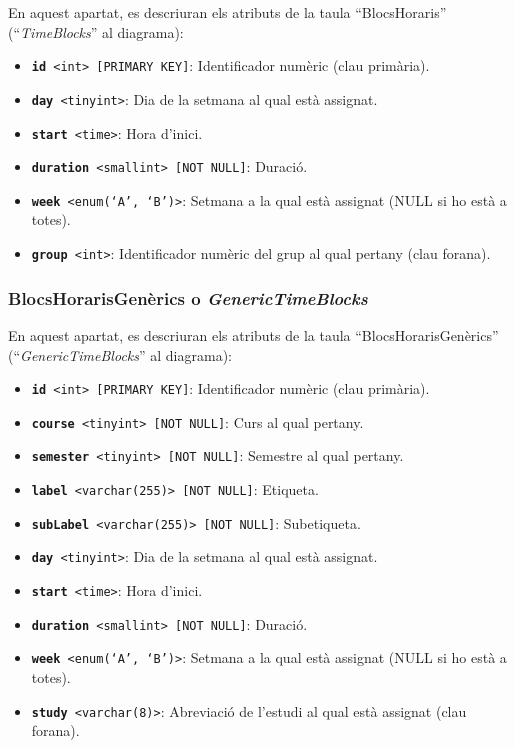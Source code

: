 \documentclass[a4paper,12pt]{ThesisStyle}
\begin{document}
En aquest apartat, es descriuran els atributs de la taula ``BlocsHoraris'' (``\textit{TimeBlocks}'' al diagrama):
\begin{itemize}
  \item \texttt{\textbf{id} <int> [PRIMARY KEY]}: Identificador numèric (clau primària).
  \item \texttt{\textbf{day} <tinyint>}: Dia de la setmana al qual està assignat.
  \item \texttt{\textbf{start} <time>}: Hora d'inici.
  \item \texttt{\textbf{duration} <smallint> [NOT NULL]}: Duració.
  \item \texttt{\textbf{week} <enum(`A', `B')>}: Setmana a la qual està assignat (NULL si ho està a totes).
  \item \texttt{\textbf{group} <int>}: Identificador numèric del grup al qual pertany (clau forana).
\end{itemize}

\subsubsection{BlocsHorarisGenèrics o \textit{GenericTimeBlocks}}

En aquest apartat, es descriuran els atributs de la taula ``BlocsHorarisGenèrics'' (``\textit{GenericTimeBlocks}'' al diagrama):
\begin{itemize}
  \item \texttt{\textbf{id} <int> [PRIMARY KEY]}: Identificador numèric (clau primària).
  \item \texttt{\textbf{course} <tinyint> [NOT NULL]}: Curs al qual pertany.
  \item \texttt{\textbf{semester} <tinyint> [NOT NULL]}: Semestre al qual pertany.
  \item \texttt{\textbf{label} <varchar(255)> [NOT NULL]}: Etiqueta.
  \item \texttt{\textbf{subLabel} <varchar(255)> [NOT NULL]}: Subetiqueta.
  \item \texttt{\textbf{day} <tinyint>}: Dia de la setmana al qual està assignat.
  \item \texttt{\textbf{start} <time>}: Hora d'inici.
  \item \texttt{\textbf{duration} <smallint> [NOT NULL]}: Duració.
  \item \texttt{\textbf{week} <enum(`A', `B')>}: Setmana a la qual està assignat (NULL si ho està a totes).
  \item \texttt{\textbf{study} <varchar(8)>}: Abreviació de l'estudi al qual està assignat (clau forana).
\end{itemize}
\end{document}
